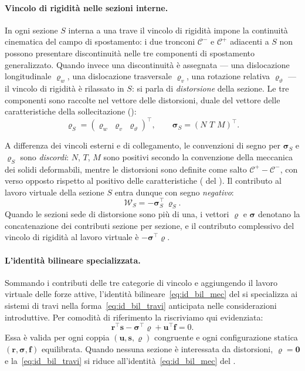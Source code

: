 \paragraph{Vincolo di rigidità nelle sezioni interne.}
In ogni sezione $S$ interna a una trave il vincolo di
rigidità impone la continuità cinematica del campo di
spostamento: i due tronconi $\mathcal{C}^-$ e
$\mathcal{C}^+$ adiacenti a $S$ non possono presentare
discontinuità nelle tre componenti di spostamento
generalizzato. Quando invece una discontinuità è assegnata
--- una dislocazione longitudinale $\varrho_w$, una
dislocazione trasversale $\varrho_v$, una rotazione
relativa $\varrho_\vartheta$ --- il vincolo di rigidità è
rilassato in $S$: si parla di \emph{distorsione} della
sezione. Le tre componenti sono raccolte nel vettore delle
distorsioni, duale del vettore delle caratteristiche della
sollecitazione ():
\begin{equation}\label{eq:varrho_sigma_S}
	\bm{\varrho}_S = (\varrho_w\,\, \varrho_v\,\,
	\varrho_\vartheta)^\top, \qquad
	\bm{\sigma}_S = (N\,\, T\,\, M)^\top.
\end{equation}

A differenza dei vincoli esterni e di collegamento, le
convenzioni di segno per $\bm{\sigma}_S$ e $\bm{\varrho}_S$
sono \emph{discordi}: $N$, $T$, $M$ sono positivi secondo
la convenzione della meccanica dei solidi deformabili,
mentre le distorsioni sono definite come salto
$\mathcal{C}^+ - \mathcal{C}^-$, con verso opposto rispetto
al positivo delle caratteristiche
( del ).
Il contributo al lavoro virtuale della sezione $S$ entra
dunque con segno \emph{negativo}:
\begin{equation}\label{eq:lavoro_sezione_S}
	\mathcal{W}_S = -\bm{\sigma}_S^\top\,\bm{\varrho}_S.
\end{equation}
Quando le sezioni sede di distorsione sono più di una, i
vettori $\bm{\varrho}$ e $\bm{\sigma}$ denotano la
concatenazione dei contributi sezione per sezione, e il
contributo complessivo del vincolo di rigidità al lavoro
virtuale è $-\bm{\sigma}^\top\bm{\varrho}$.


\paragraph{L'identità bilineare specializzata.}
Sommando i contributi delle tre categorie di vincolo e
aggiungendo il lavoro virtuale delle forze attive,
l'identità bilineare~\eqref{eq:id_bil_mec} del
 si specializza ai sistemi di travi nella
forma~\eqref{eq:id_bil_travi} anticipata nelle
considerazioni introduttive. Per comodità di riferimento
la riscriviamo qui evidenziata:
\begin{equation*}
	\boxed{\bm{r}^\top\bm{s} -	\bm{\sigma}^\top\bm{\varrho} +	\bm{u}^\top\bm{f} = 0.}
\end{equation*}
Essa è valida per ogni coppia $(\bm{u}, \bm{s},
\bm{\varrho})$ congruente e ogni configurazione statica
$(\bm{r}, \bm{\sigma}, \bm{f})$ equilibrata. Quando nessuna
sezione è interessata da distorsioni, $\bm{\varrho} =
\bm{0}$ e la~\eqref{eq:id_bil_travi} si riduce
all'identità~\eqref{eq:id_bil_mec} del .


